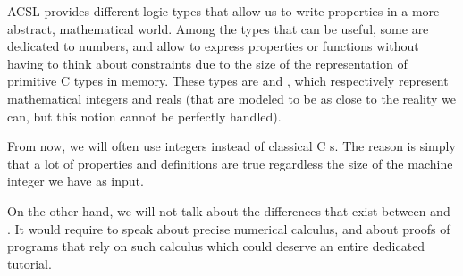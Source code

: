 ACSL provides different logic types that allow us to write properties in a more
abstract, mathematical world. Among the types that can be useful, some are
dedicated to numbers, and allow to express properties or functions without
having to think about constraints due to the size of
the representation of primitive C types in memory. These types are
 and , which respectively represent
mathematical integers and reals (that are modeled to be as close to the
reality we can, but this notion cannot be perfectly handled).

From now, we will often use integers instead of classical C
s. The reason is simply that a lot of properties and
definitions are true regardless the size of the machine integer we have
as input.

On the other hand, we will not talk about the differences that exist
between  and . It would require to
speak about precise numerical calculus, and about proofs of programs
that rely on such calculus which could deserve an entire dedicated
tutorial.
